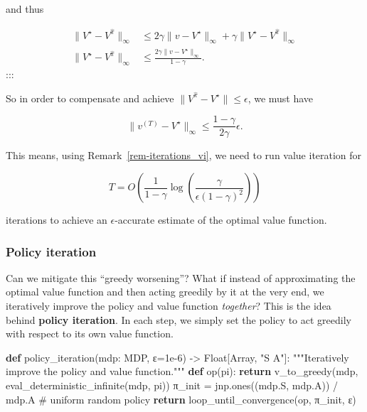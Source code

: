 \documentclass[
  letterpaper,
  DIV=11,
  numbers=noendperiod]{scrreprt}
\newenvironment{Shaded}{\begin{snugshade}}{\end{snugshade}}
\newcommand{\CommentTok}[1]{\textcolor[rgb]{0.37,0.37,0.37}{#1}}
\newcommand{\ControlFlowTok}[1]{\textcolor[rgb]{0.00,0.23,0.31}{\textbf{#1}}}
\newcommand{\FloatTok}[1]{\textcolor[rgb]{0.68,0.00,0.00}{#1}}
\newcommand{\KeywordTok}[1]{\textcolor[rgb]{0.00,0.23,0.31}{\textbf{#1}}}
\newcommand{\NormalTok}[1]{\textcolor[rgb]{0.00,0.23,0.31}{#1}}
\newcommand{\OperatorTok}[1]{\textcolor[rgb]{0.37,0.37,0.37}{#1}}
\newcommand{\StringTok}[1]{\textcolor[rgb]{0.13,0.47,0.30}{#1}}
\theoremstyle{plain}
\theoremstyle{plain}
\theoremstyle{definition}
\theoremstyle{definition}
\theoremstyle{remark}
\begin{document}
and thus

\[
\begin{aligned}
        \|V^\star - V^{\hat \pi}\|_\infty &\le 2 \gamma \|v - V^{\star}\|_{\infty} + \gamma \|V^{\star} - V^{\hat \pi}\|_\infty \\
        \|V^\star - V^{\hat \pi}\|_\infty &\le \frac{2 \gamma \|v - V^{\star}\|_{\infty}}{1-\gamma}.
\end{aligned}
\] :::

So in order to compensate and achieve
\(\|V^{\hat \pi} - V^{\star}\| \le \epsilon\), we must have

\[\|v^{(T)} - V^\star\|_{\infty} \le \frac{1-\gamma}{2 \gamma} \epsilon.\]

This means, using Remark~\ref{rem-iterations_vi}, we need to run value
iteration for

\[T = O\left( \frac{1}{1-\gamma} \log\left(\frac{\gamma}{\epsilon (1-\gamma)^2}\right) \right)\]

iterations to achieve an \(\epsilon\)-accurate estimate of the optimal
value function.

\subsubsection{Policy iteration}\label{sec-policy_iteration}

Can we mitigate this ``greedy worsening''? What if instead of
approximating the optimal value function and then acting greedily by it
at the very end, we iteratively improve the policy and value function
\emph{together}? This is the idea behind \textbf{policy iteration}. In
each step, we simply set the policy to act greedily with respect to its
own value function.

\begin{Shaded}
\begin{Highlighting}[]
\KeywordTok{def}\NormalTok{ policy\_iteration(mdp: MDP, ε}\OperatorTok{=}\FloatTok{1e{-}6}\NormalTok{) }\OperatorTok{{-}\textgreater{}}\NormalTok{ Float[Array, }\StringTok{"S A"}\NormalTok{]:}
    \CommentTok{"""Iteratively improve the policy and value function."""}
    \KeywordTok{def}\NormalTok{ op(pi):}
        \ControlFlowTok{return}\NormalTok{ v\_to\_greedy(mdp, eval\_deterministic\_infinite(mdp, pi))}
\NormalTok{    π\_init }\OperatorTok{=}\NormalTok{ jnp.ones((mdp.S, mdp.A)) }\OperatorTok{/}\NormalTok{ mdp.A  }\CommentTok{\# uniform random policy}
    \ControlFlowTok{return}\NormalTok{ loop\_until\_convergence(op, π\_init, ε)}
\end{Highlighting}
\end{Shaded}
\end{document}
